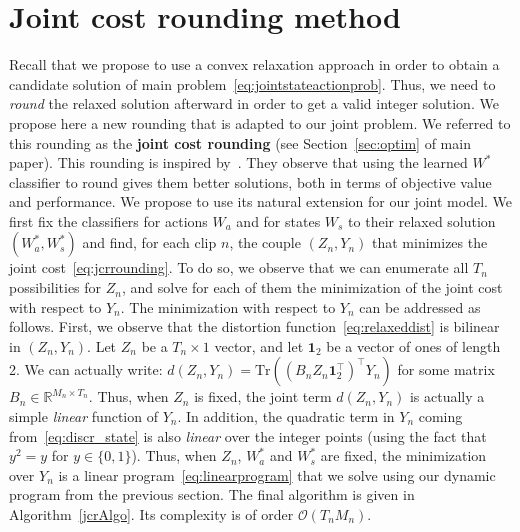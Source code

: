 \section{Joint cost rounding method}
\label{app:jcr}

Recall that we propose to use a convex relaxation approach in order to obtain a candidate solution of main problem~\eqref{eq:jointstateactionprob}.
Thus, we need to \emph{round} the relaxed solution afterward in order to get a valid integer solution.
We propose here a new rounding that is adapted to our joint problem.
We referred to this rounding as the \textbf{joint cost rounding} (see Section~\ref{sec:optim} of main paper).
This rounding is inspired by~\cite{Bojanowski15weakly,Alayrac15Unsupervised}.
They observe that using the learned $W^*$ classifier to round gives them better solutions, both in terms of objective value and performance.
We propose to use its natural extension for our joint model.
We first fix the classifiers for actions $W_a$ and for states $W_s$ to their relaxed solution $(W_a^*, W_s^*)$ and find, for each clip $n$, the couple $(Z_n,Y_n)$ that minimizes the joint cost~\eqref{eq:jcrrounding}.
To do so, we observe that we can enumerate all $T_n$ possibilities for $Z_n$, and solve for each of them the minimization of the joint cost with respect to $Y_n$.
The minimization with respect to $Y_n$ can be addressed as follows.
First, we observe that the distortion function~\eqref{eq:relaxeddist} is bilinear in $(Z_n,Y_n)$.
Let $Z_n$ be a $T_n \times 1$ vector, and let $\mathbf{1}_2$ be a vector of ones of length 2.
We can actually write: $d(Z_n,Y_n)=\text{Tr}(( B_n Z_n \mathbf{1}_2^\top)^\top Y_n)$ for some matrix $B_n\in\mathbb{R}^{M_n \times T_n}$.
Thus, when $Z_n$ is fixed, the joint term $d(Z_n,Y_n)$ is actually a simple \emph{linear} function of $Y_n$.
In addition, the quadratic term in $Y_n$ coming from~\eqref{eq:discr_state} is also \emph{linear} over the integer points (using the fact that $y^2=y$ for $y\in\{0,1\}$). 
Thus, when $Z_n$, $W_a^*$ and $W_s^*$ are fixed, the minimization over $Y_n$ is a linear program~\eqref{eq:linearprogram} that we solve using our dynamic program from the previous section.
The final algorithm is given in Algorithm~\ref{jcrAlgo}.
Its complexity is of order $\mathcal{O}(T_nM_n)$.

